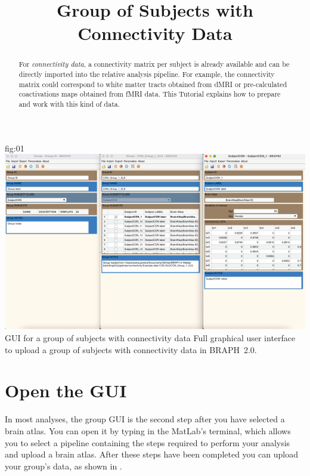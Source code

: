 \documentclass[justified]{tufte-handout}
\title{Group of Subjects with Connectivity Data}
\begin{document}
\maketitle

\begin{abstract}
\noindent
For \emph{connectivity data}, a connectivity matrix per subject is already available and can be directly imported into the relative analysis pipeline. For example, the connectivity matrix could correspond to white matter tracts obtained from dMRI or pre-calculated coactivations maps obtained from fMRI data.
This Tutorial explains how to prepare and work with this kind of data.
\end{abstract}

\tableofcontents

	{fig:01}
	{\includegraphics{fig01.png}}
	{GUI for a group of subjects with connectivity data}
	{
	Full graphical user interface to upload a group of subjects with connectivity data in BRAPH~2.0. 
	}

\clearpage
\section{Open the GUI}

In most analyses, the group GUI is the second step after you have selected a brain atlas. You can open it by typing  in the MatLab's terminal, which allows you to select a pipeline containing the steps required to perform your analysis and upload a brain atlas. After these steps have been completed you can upload your group's data, as shown in .
\end{document}
